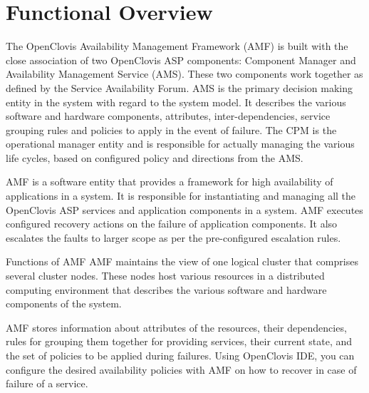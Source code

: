 
\hypertarget{group__group8}{
\chapter{Functional Overview}
\label{group__group8}
}



The OpenClovis Availability Management Framework (AMF) is built with the close association of two 
OpenClovis ASP components: Component Manager and Availability Management Service (AMS). These two components work together as defined by 
the Service Availability Forum. AMS is the primary decision making entity in the system with regard to the system model. 
It describes the various software and hardware components, attributes, inter-dependencies, service grouping rules and policies to apply in 
the event of failure. The CPM is the operational manager entity and is responsible for actually managing the various life cycles, 
based on configured policy and directions from the AMS.\par
 \par
 AMF is a software entity that provides a framework for high availability of applications in a system. It is responsible for instantiating 
 and managing all the OpenClovis ASP services and application components in a system. AMF executes configured recovery actions on the 
 failure of application components. It also escalates the faults to larger scope as per the pre-configured escalation rules.
\begin{Desc}
\item[Functions of AMF]AMF maintains the view of one logical cluster that comprises several cluster nodes. These nodes host various 
resources in a distributed computing environment that describes the various software and hardware components of the system.\par
 \par
 AMF stores information about attributes of the resources, their dependencies, rules for grouping them together for providing services, 
 their current state, and the set of policies to be applied during failures. Using Open\-Clovis IDE, you can configure the desired 
 availability policies with AMF on how to recover in case of failure of a service.\end{Desc}
